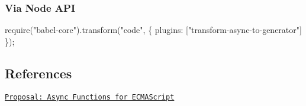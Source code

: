 \subsubsection*{Via Node A\+PI}


\begin{DoxyCode}
require("babel-core").transform("code", \{
  plugins: ["transform-async-to-generator"]
\});
\end{DoxyCode}


\subsection*{References}


\begin{DoxyItemize}
\item \href{https://github.com/tc39/ecmascript-asyncawait}{\tt Proposal\+: Async Functions for E\+C\+M\+A\+Script} 
\end{DoxyItemize}